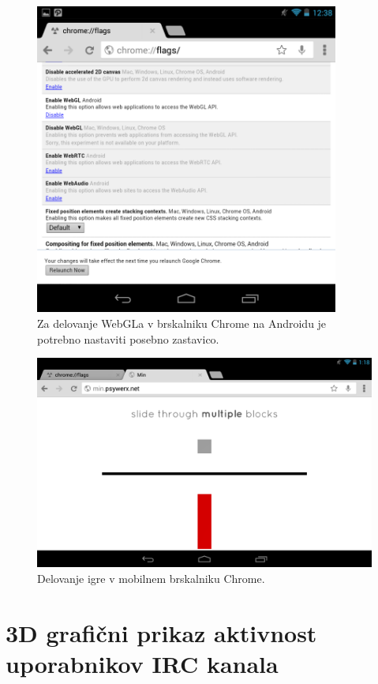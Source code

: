 \begin{figure}
\begin{center}
\includegraphics[width=10cm]{pic/min-chrome-flag.png}
\end{center}
\caption{Za delovanje WebGLa v brskalniku Chrome na Androidu je potrebno nastaviti posebno zastavico.}
\label{minchromeflag}
\end{figure} 

\begin{figure}
\begin{center}
\includegraphics[width=12cm]{pic/min-chrome.png}
\end{center}
\caption{Delovanje igre v mobilnem brskalniku Chrome.}
\label{minchrome}
\end{figure}

\section{3D grafični prikaz aktivnost uporabnikov IRC kanala}


